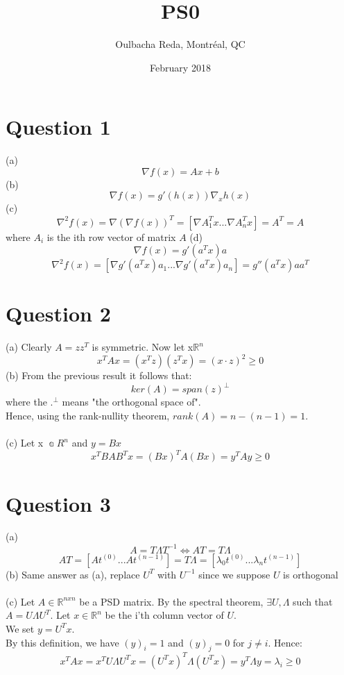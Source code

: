 \documentclass{article}
\title{PS0}
\author{Oulbacha Reda, Montréal, QC}
\date{February 2018}
\begin{document}
\maketitle

\section*{Question 1}
(a) $$\nabla f(x) = Ax + b$$ \n
(b) $$\nabla f(x) = g'(h(x)) \nabla_x h(x)$$ \n  
(c) $$ \nabla^2 f(x) = \nabla(\nabla f(x))^T = [\nabla A_1^Tx ... \nabla A_n^Tx ]  = A^T = A $$ where $A_i$ is the ith row vector of matrix $A$ \newline
(d) $$\nabla f(x) = g'(a^Tx)a$$ \n
$$ \nabla^2 f(x) = [ \nabla g'(a^Tx)a_1 ... \nabla g'(a^Tx)a_n ] = g''(a^Tx)aa^T $$

\section*{Question 2}
(a) Clearly $A = zz^T$ is symmetric. Now let x\in$\mathbb R^n$ \n
$$x^TAx = (x^Tz)(z^Tx) = (x \cdot z)^2 \ge  0$$ \n
(b) From the previous result it follows that:
$$ker(A) = span(z)^\bot$$ where the $.^\bot$ means "the orthogonal space of". \n
\\ Hence, using the rank-nullity theorem, $rank(A) = n - (n-1) = 1 $.
\\
\\
(c) Let x \in $\Bbba R^n$ \n and $y=Bx$ 
$$x^TBAB^Tx = (Bx)^TA(Bx) = y^TAy\ge0$$
\section*{Question 3}
(a) $$A=T\Lambda T^{-1} \Leftrightarrow AT = T\Lambda$$
$$ AT = [At^{(0)}...At^{(n-1)}] = T\Lambda = [\lambda_0t^{(0)}...\lambda_nt^{(n-1)}] $$
(b) Same answer as (a), replace $U^T$ with $U^{-1}$ since we suppose $U$ is orthogonal \\ 
\\
(c) Let $A\in\mathbb R^{nxn}$ be a PSD matrix. By the spectral theorem, $\exists U,\Lambda$ such that $A = U\Lambda U^T$. Let $x\in\mathbb{R}^n$ be the i'th column vector of $U$.\\
We set $y=U^Tx$.\\
By this definition, we have $(y)_i = 1$ and $(y)_j = 0$ for $j\neq i$. Hence:
$$x^TAx = x^TU\Lambda U^Tx = (U^Tx)^T\Lambda(U^Tx) = y^T\Lambda y = \lambda_i \ge0$$
\end{document}
